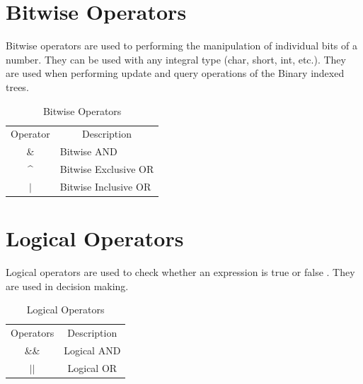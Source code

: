 \documentclass[openany]{book}  %
\begin{document}
\begin{flushleft}
    \newpage

    \section{Bitwise Operators}
    Bitwise operators\cite{Ref8} are used to performing the manipulation of individual bits of a number.
    They can be used with any integral type (char, short, int, etc.). They are used when performing update and query operations of the Binary indexed trees.
    \begin{table}[htbp]
        \begin{tabular}{cl}
            Operator           & \multicolumn{1}{c}{Description} \\
            \&                 & Bitwise AND                     \\
            \textasciicircum{} & Bitwise Exclusive OR            \\
            $\vert$            & Bitwise Inclusive OR
        \end{tabular}
        \centering
        \caption{Bitwise Operators}
    \end{table}
    \section{Logical Operators}
    Logical operators\cite{Ref8} are used to check whether an expression is true or false . They are used in decision making.
    \begin{table}[htbp]
        \begin{tabular}{cc}
            Operators      & Description \\
            \&\&           & Logical AND \\
            $\vert$$\vert$ & Logical OR
        \end{tabular}
        \centering
        \caption{Logical Operators}
    \end{table}

\end{flushleft}
\end{document}
